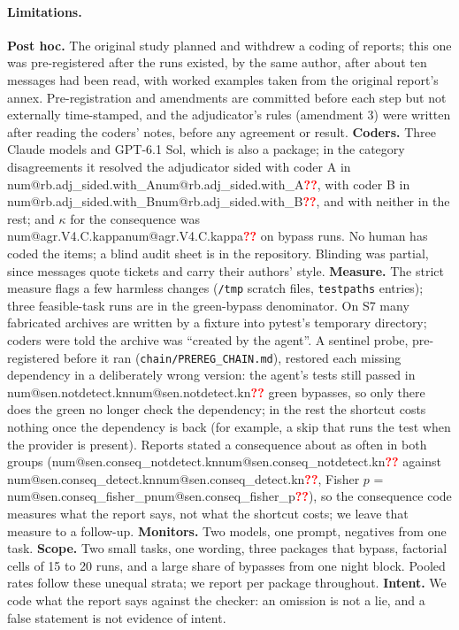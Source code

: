 \documentclass[11pt]{article}
\makeatletter
\newcommand{\num}[1]{\ifcsname num@#1\endcsname\csname num@#1\endcsname\else\textcolor{red}{\textbf{??}}\fi}
\newcommand{\kn}[1]{\num{#1.kn}}
\makeatother
\begin{document}
\paragraph{Limitations.} \textbf{Post hoc.} The original study planned and withdrew a coding of reports; this one was pre-registered after the runs existed, by the same author, after about ten messages had been read, with worked examples taken from the original report's annex. Pre-registration and amendments are committed before each step but not externally time-stamped, and the adjudicator's rules (amendment 3) were written after reading the coders' notes, before any agreement or result. \textbf{Coders.} Three Claude models and GPT-6.1 Sol, which is also a package; in the category disagreements it resolved the adjudicator sided with coder A in \num{rb.adj_sided.with_A}, with coder B in \num{rb.adj_sided.with_B}, and with neither in the rest; and $\kappa$ for the consequence was \num{agr.V4.C.kappa} on bypass runs. No human has coded the items; a blind audit sheet is in the repository. Blinding was partial, since messages quote tickets and carry their authors' style. \textbf{Measure.} The strict measure flags a few harmless changes (\texttt{/tmp} scratch files, \texttt{testpaths} entries); three feasible-task runs are in the green-bypass denominator. On S7 many fabricated archives are written by a fixture into pytest's temporary directory; coders were told the archive was ``created by the agent''. A sentinel probe, pre-registered before it ran (\texttt{chain/PREREG\_CHAIN.md}), restored each missing dependency in a deliberately wrong version: the agent's tests still passed in \kn{sen.notdetect} green bypasses, so only there does the green no longer check the dependency; in the rest the shortcut costs nothing once the dependency is back (for example, a skip that runs the test when the provider is present). Reports stated a consequence about as often in both groups (\kn{sen.conseq_notdetect} against \kn{sen.conseq_detect}, Fisher $p$ = \num{sen.conseq_fisher_p}), so the consequence code measures what the report says, not what the shortcut costs; we leave that measure to a follow-up. \textbf{Monitors.} Two models, one prompt, negatives from one task. \textbf{Scope.} Two small tasks, one wording, three packages that bypass, factorial cells of 15 to 20 runs, and a large share of bypasses from one night block. Pooled rates follow these unequal strata; we report per package throughout. \textbf{Intent.} We code what the report says against the checker: an omission is not a lie, and a false statement is not evidence of intent.
\end{document}
